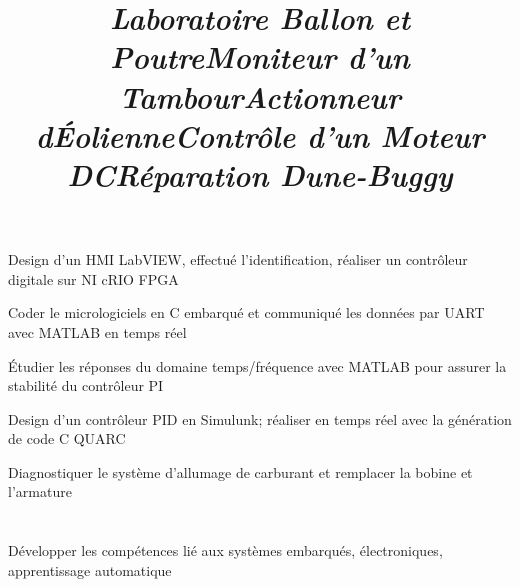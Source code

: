 \documentclass[mm]{res}
\begin{document}
\begin{resume}
\title{\textsl{Laboratoire Ballon et Poutre}}
\begin{position}
\tb Design d'un HMI LabVIEW, effectu\'e l'identification, r\'ealiser un contr\^oleur digitale sur NI cRIO FPGA
\end{position}

\title{\textsl{Moniteur d'un Tambour}}
\begin{position}
\tb Coder le micrologiciels en C embarqu\'e et communiqu\'e les donn\'ees par UART avec MATLAB en temps r\'eel
\end{position}

\title{\textsl{Actionneur d\textquotesingle \'Eolienne}}
\begin{position}
\tb \'Etudier les r\'eponses du domaine temps/fr\'equence avec MATLAB pour assurer la stabilit\'e du contr\^oleur PI
\end{position}

\title{\textsl{Contr\^ole d'un Moteur DC}}
\begin{position}
\tb Design d'un contr\^oleur PID en Simulunk; r\'ealiser en temps r\'eel avec la g\'en\'eration de code C QUARC
\end{position}

\title{\textsl{R\'eparation Dune-Buggy}}
\begin{position}
\tb Diagnostiquer le syst\`eme d'allumage de carburant et remplacer la bobine et l'armature
\end{position}


\toprule

\section{\headinginterests}
\tb D\'evelopper les comp\'etences li\'e aux syst\`emes embarqu\'es, \'electroniques, apprentissage automatique 

\end{resume}
\end{document}
